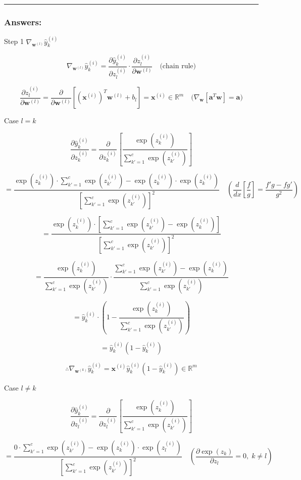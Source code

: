 \documentclass[
  letterpaper,
  DIV=11,
  numbers=noendperiod]{scrartcl}
\begin{document}
\begin{center}\rule{0.5\linewidth}{0.5pt}\end{center}

\subsubsection{Answers:}\label{answers}

Step 1 \(\nabla_{\mathbf{w}^{(l)}} \hat{y}_k^{(i)}\)

\[\nabla_{\mathbf{w}^{(l)}} \hat{y}_k^{(i)} = \frac{\partial \hat{y}_k^{(i)}}{\partial z_l^{(i)}} \cdot \frac{\partial z_l^{(i)}}{\partial \mathbf{w}^{(l)}} \quad \text{(chain rule)}\]

\[\frac{\partial z_l^{(i)}}{\partial \mathbf{w}^{(l)}} = \frac{\partial}{\partial \mathbf{w}^{(l)}}[(\mathbf{x}^{(i)})^T \mathbf{w}^{(l)} + b_l] = \mathbf{x}^{(i)} \in \mathbb{R}^m \quad \text{(}\nabla_{\mathbf{w}}[\mathbf{a}^T\mathbf{w}] = \mathbf{a}\text{)}\]

Case \(l = k\)

\[\frac{\partial \hat{y}_k^{(i)}}{\partial z_k^{(i)}} = \frac{\partial}{\partial z_k^{(i)}}\left[\frac{\exp(z_k^{(i)})}{\sum_{k'=1}^c \exp(z_{k'}^{(i)})}\right]\]

\[= \frac{\exp(z_k^{(i)}) \cdot \sum_{k'=1}^c \exp(z_{k'}^{(i)}) - \exp(z_k^{(i)}) \cdot \exp(z_k^{(i)})}{[\sum_{k'=1}^c \exp(z_{k'}^{(i)})]^2} \quad \left(\frac{d}{dx}\left[\frac{f}{g}\right] = \frac{f'g - fg'}{g^2}\right)\]

\[= \frac{\exp(z_k^{(i)}) \cdot [\sum_{k'=1}^c \exp(z_{k'}^{(i)}) - \exp(z_k^{(i)})]}{[\sum_{k'=1}^c \exp(z_{k'}^{(i)})]^2}\]

\[= \frac{\exp(z_k^{(i)})}{\sum_{k'=1}^c \exp(z_{k'}^{(i)})} \cdot \frac{\sum_{k'=1}^c \exp(z_{k'}^{(i)}) - \exp(z_k^{(i)})}{\sum_{k'=1}^c \exp(z_{k'}^{(i)})}\]

\[= \hat{y}_k^{(i)} \cdot \left(1 - \frac{\exp(z_k^{(i)})}{\sum_{k'=1}^c \exp(z_{k'}^{(i)})}\right)\]

\[= \hat{y}_k^{(i)}(1 - \hat{y}_k^{(i)})\]

\[\therefore \nabla_{\mathbf{w}^{(k)}} \hat{y}_k^{(i)} = \mathbf{x}^{(i)} \hat{y}_k^{(i)}(1 - \hat{y}_k^{(i)}) \in \mathbb{R}^m\]

Case \(l \neq k\)

\[\frac{\partial \hat{y}_k^{(i)}}{\partial z_l^{(i)}} = \frac{\partial}{\partial z_l^{(i)}}\left[\frac{\exp(z_k^{(i)})}{\sum_{k'=1}^c \exp(z_{k'}^{(i)})}\right]\]

\[= \frac{0 \cdot \sum_{k'=1}^c \exp(z_{k'}^{(i)}) - \exp(z_k^{(i)}) \cdot \exp(z_l^{(i)})}{[\sum_{k'=1}^c \exp(z_{k'}^{(i)})]^2} \quad \left(\frac{\partial \exp(z_k)}{\partial z_l} = 0, \; k \neq l\right)\]
\end{document}
